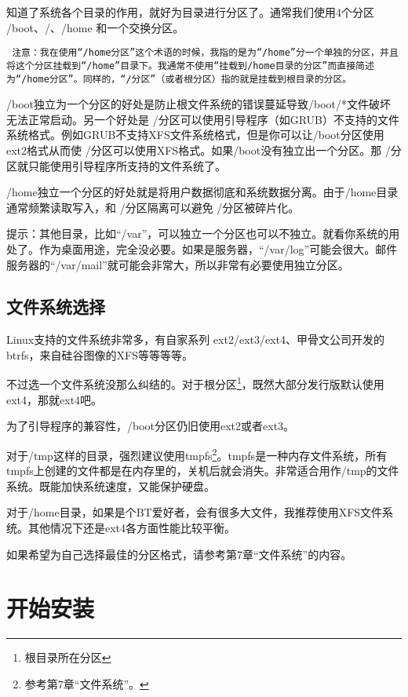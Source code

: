 \documentclass[amstex,twoside]{ctexbook}
\newenvironment{notice}{\tt}{}
\begin{document}
知道了系统各个目录的作用，就好为目录进行分区了。通常我们使用4个分区 /boot、/、/home 和一个交换分区。

\begin{notice}
注意：我在使用“/home分区”这个术语的时候，我指的是为“/home”分一个单独的分区，并且将这个分区挂载到“/home”目录下。我通常不使用“挂载到/home目录的分区”而直接简述为“/home分区”。同样的，“/分区”（或者根分区）指的就是挂载到根目录的分区。
\end{notice}

/boot独立为一个分区的好处是防止根文件系统的错误蔓延导致/boot/*文件破坏无法正常启动。另一个好处是 /分区可以使用引导程序（如GRUB）不支持的文件系统格式。例如GRUB不支持XFS文件系统格式，但是你可以让/boot分区使用ext2格式从而使 /分区可以使用XFS格式。如果/boot没有独立出一个分区。那 /分区就只能使用引导程序所支持的文件系统了。

/home独立一个分区的好处就是将用户数据彻底和系统数据分离。由于/home目录通常频繁读取写入，和 /分区隔离可以避免 /分区被碎片化。

提示：其他目录，比如“/var”，可以独立一个分区也可以不独立。就看你系统的用处了。作为桌面用途，完全没必要。如果是服务器，“/var/log”可能会很大。邮件服务器的“/var/mail”就可能会非常大，所以非常有必要使用独立分区。

\subsection{文件系统选择}


Linux支持的文件系统非常多，有自家系列 ext2/ext3/ext4、甲骨文公司开发的btrfs，来自硅谷图像的XFS等等等等。

不过选一个文件系统没那么纠结的。对于根分区\footnote{根目录所在分区}，既然大部分发行版默认使用ext4，那就ext4吧。

为了引导程序的兼容性，/boot分区仍旧使用ext2或者ext3。

对于/tmp这样的目录，强烈建议使用tmpfs\footnote{参考第7章“文件系统”。}。tmpfs是一种内存文件系统，所有tmpfs上创建的文件都是在内存里的，关机后就会消失。非常适合用作/tmp的文件系统。既能加快系统速度，又能保护硬盘。

对于/home目录，如果是个BT爱好者，会有很多大文件，我推荐使用XFS文件系统。其他情况下还是ext4各方面性能比较平衡。

如果希望为自己选择最佳的分区格式，请参考第7章“文件系统”的内容。

\section{开始安装}
\end{document}

